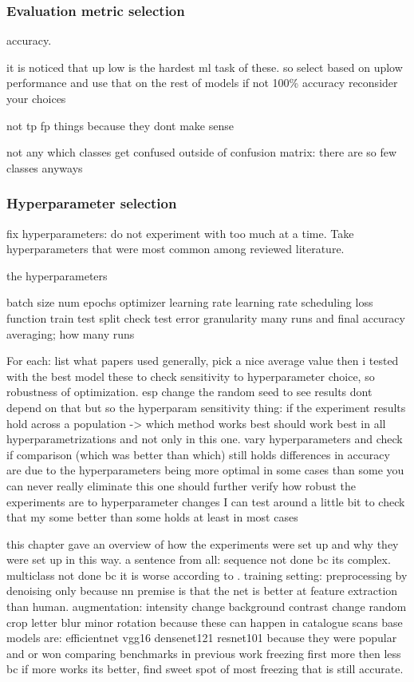 \documentclass{article}
\begin{document}
\subsubsection{Evaluation metric selection}

accuracy.

it is noticed that up low is the hardest ml task of these. so select based on uplow performance and use that on the rest of models
if not 100\% accuracy reconsider your choices

not tp fp things because they dont make sense

not any which classes get confused outside of confusion matrix: there are so few classes anyways

\subsubsection{Hyperparameter selection}

fix hyperparameters: do not experiment with too much at a time.
Take hyperparameters that were most common among reviewed literature.

the hyperparameters

batch size 
num epochs 
optimizer 
learning rate 
learning rate scheduling
loss function
train test split
    check test error granularity
many runs and final accuracy averaging; how many runs

For each: list what papers used generally, pick a nice average value
then i tested with the best model these to check sensitivity to hyperparameter choice, so 
robustness of optimization. esp change the random seed to see results dont depend on that
    but so the hyperparam sensitivity thing:
        if the experiment results hold across a population -> which method works best should work best in all 
            hyperparametrizations and not only in this one. vary hyperparameters and check if comparison 
                (which was better than which) still holds
        differences in accuracy are due to the hyperparameters being more optimal in some cases than some 
            you can never really eliminate this 
            one should further verify how robust the experiments are to hyperparameter changes
            I can test around a little bit to check that my some better than some holds at least in most cases

this chapter gave an overview of how the experiments were set up and why they were set up in this way.
a sentence from all: sequence not done bc its complex. multiclass not done bc it is worse according to \cite{tibetan_ocr}.
training setting: preprocessing by denoising only because nn premise is that the net is better at feature extraction than human.
augmentation: intensity change background contrast change random crop letter blur minor rotation because these can happen in catalogue scans
base models are: efficientnet vgg16 densenet121 resnet101 because they were popular and or won comparing benchmarks in previous work
freezing first more then less bc if more works its better, find sweet spot of most freezing that is still accurate.
\end{document}
